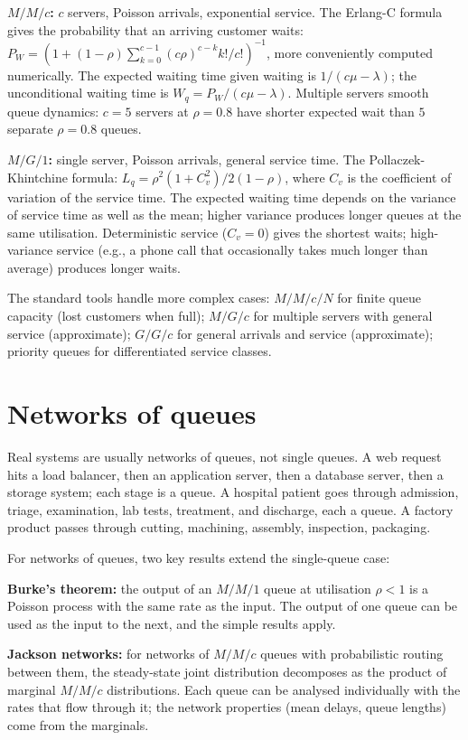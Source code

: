 \textbf{$M/M/c$:} $c$ servers, Poisson arrivals, exponential service. The Erlang-C formula gives the probability that an arriving customer waits: $P_W = (1 + (1-\rho) \sum_{k=0}^{c-1} (c\rho)^{c-k} k! / c!)^{-1}$, more conveniently computed numerically. The expected waiting time given waiting is $1/(c\mu - \lambda)$; the unconditional waiting time is $W_q = P_W / (c\mu - \lambda)$. Multiple servers smooth queue dynamics: $c = 5$ servers at $\rho = 0.8$ have shorter expected wait than $5$ separate $\rho = 0.8$ queues.

\textbf{$M/G/1$:} single server, Poisson arrivals, general service time. The Pollaczek-Khintchine formula: $L_q = \rho^2 (1 + C_v^2)/2(1-\rho)$, where $C_v$ is the coefficient of variation of the service time. The expected waiting time depends on the variance of service time as well as the mean; higher variance produces longer queues at the same utilisation. Deterministic service ($C_v = 0$) gives the shortest waits; high-variance service (e.g., a phone call that occasionally takes much longer than average) produces longer waits.

The standard tools handle more complex cases: $M/M/c/N$ for finite queue capacity (lost customers when full); $M/G/c$ for multiple servers with general service (approximate); $G/G/c$ for general arrivals and service (approximate); priority queues for differentiated service classes.

\section{Networks of queues}

Real systems are usually networks of queues, not single queues. A web request hits a load balancer, then an application server, then a database server, then a storage system; each stage is a queue. A hospital patient goes through admission, triage, examination, lab tests, treatment, and discharge, each a queue. A factory product passes through cutting, machining, assembly, inspection, packaging.

For networks of queues, two key results extend the single-queue case:

\textbf{Burke's theorem:} the output of an $M/M/1$ queue at utilisation $\rho < 1$ is a Poisson process with the same rate as the input. The output of one queue can be used as the input to the next, and the simple results apply.

\textbf{Jackson networks:} for networks of $M/M/c$ queues with probabilistic routing between them, the steady-state joint distribution decomposes as the product of marginal $M/M/c$ distributions. Each queue can be analysed individually with the rates that flow through it; the network properties (mean delays, queue lengths) come from the marginals.

